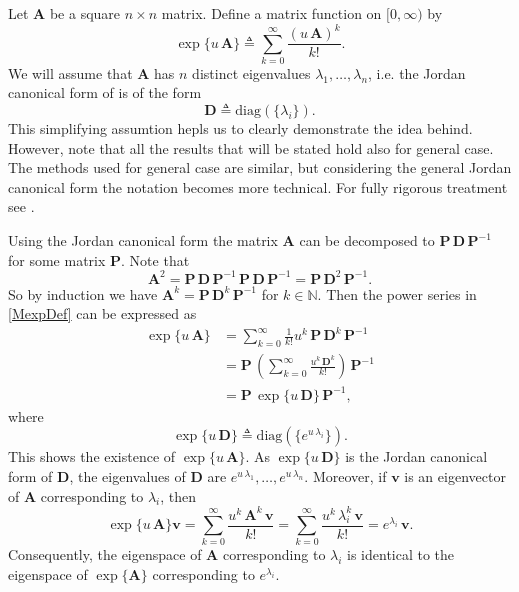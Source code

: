 \begin{appendices}
Let $\bm{A}$ be a square $n \times n$ matrix. Define a matrix function on $[0,\infty)$ by
\begin{equation}
\label{MexpDef}
\exp\{u\,\bm{A}\}\triangleq \sum_{k=0}^{\infty}\frac{(u\,\bm{A})^k}{k!}.
\end{equation}  
We will assume that $\bm{A}$ has $n$ distinct eigenvalues $\lambda_1,\dots,\lambda_n$, i.e. the Jordan canonical form of  is of the form
\[\bm{D}\triangleq\text{diag}(\{\lambda_i\}).\]
This simplifying assumtion hepls us to clearly demonstrate the idea behind. However, note that all the results that will be stated hold also for general case. The methods used for general case are similar, but considering the general Jordan canonical form the notation becomes more technical. For fully rigorous treatment see \cite{Baker}. 


Using the Jordan canonical form the matrix $\bm{A}$ can be decomposed to $\bm{P}\,\bm{D}\,\bm{P}^{-1}$ for some matrix $\bm{P}$.  Note that 
\[\bm{A}^2=\bm{P}\,\bm{D}\,\bm{P}^{-1}\,\bm{P}\,\bm{D}\,\bm{P}^{-1}=\bm{P}\,\bm{D}^2\,\bm{P}^{-1}.\]
So by induction we have $\bm{A}^k=\bm{P}\,\bm{D}^k\,\bm{P}^{-1}$ for $k\in\mathbb{N}$. Then the power series in \ref{MexpDef} can be expressed as
\begin{align*}
\exp\{u\,\bm{A}\}&= \sum_{k=0}^{\infty}\frac{1}{k!}u^k\,\bm{P}\,\bm{D}^k\,\bm{P}^{-1}\\
&=\bm{P}\,\left(\sum_{k=0}^{\infty}\frac{u^k\,\bm{D}^k}{k!}\right)\,\bm{P}^{-1}\\
&=\bm{P}\,\exp\{u\,\bm{D}\}\,\bm{P}^{-1},
\end{align*}
where
\[\exp\{u\,\bm{D}\}\triangleq\text{diag}(\{e^{u\,\lambda_i}\}).\]
This shows the existence of $\exp\{u\,\bm{A}\}$. As $\exp\{u\,\bm{D}\}$ is the Jordan canonical form of $\bm{D}$, the eigenvalues of $\bm{D}$ are $e^{u\,\lambda_1},\dots,e^{u\,\lambda_n}$. 
Moreover, if $\bm{v}$ is an eigenvector of $\bm{A}$ corresponding to $\lambda_i$, then
\[\exp\{u\,\bm{A}\}\bm{v}=\sum_{k=0}^{\infty}\frac{u^k\,\bm{A}^k\,\bm{v}}{k!}=\sum_{k=0}^{\infty}\frac{u^k\,\lambda_i^k\,\bm{v}}{k!}=e^{\lambda_i}\,\bm{v}.\]
Consequently, the eigenspace of $\bm{A}$ corresponding to $\lambda_i$ is identical to the eigenspace of $\exp\{\bm{A}\}$ corresponding to $e^{\lambda_i}$. 


\end{appendices}
